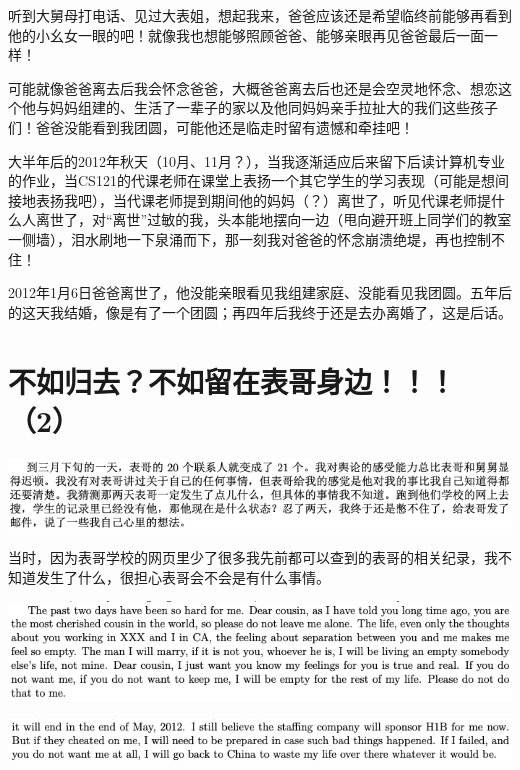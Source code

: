 \documentclass[9pt, b5paper]{article}
\begin{document}
听到大舅母打电话、见过大表姐，想起我来，爸爸应该还是希望临终前能够再看到他的小幺女一眼的吧！就像我也想能够照顾爸爸、能够亲眼再见爸爸最后一面一样！

可能就像爸爸离去后我会怀念爸爸，大概爸爸离去后也还是会空灵地怀念、想恋这个他与妈妈组建的、生活了一辈子的家以及他同妈妈亲手拉扯大的我们这些孩子们！爸爸没能看到我团圆，可能他还是临走时留有遗憾和牵挂吧！

大半年后的2012年秋天（10月、11月？），当我逐渐适应后来留下后读计算机专业的作业，当CS121的代课老师在课堂上表扬一个其它学生的学习表现（可能是想间接地表扬我吧），当代课老师提到期间他的妈妈（？）离世了，听见代课老师提什么人离世了，对“离世”过敏的我，头本能地摆向一边（甩向避开班上同学们的教室一侧墙），泪水刷地一下泉涌而下，那一刻我对爸爸的怀念崩溃绝堤，再也控制不住！

2012年1月6日爸爸离世了，他没能亲眼看见我组建家庭、没能看见我团圆。五年后的这天我结婚，像是有了一个团圆；再四年后我终于还是去办离婚了，这是后话。 

\section{不如归去？不如留在表哥身边！！！（2）}
\label{sec:org4e0d8cb}

\begin{center}
\includegraphics[width=.9\linewidth]{./pic/backups_plans_20210415_111452.png}
\end{center}

当时，因为表哥学校的网页里少了很多我先前都可以查到的表哥的相关纪录，我不知道发生了什么，很担心表哥会不会是有什么事情。

\begin{center}
\includegraphics[width=.9\linewidth]{./pic/backups_plans_20210415_105943.png}
\end{center}

\begin{center}
\includegraphics[width=.9\linewidth]{./pic/backups_plans_20210415_110050.png}
\end{center}
\end{document}
